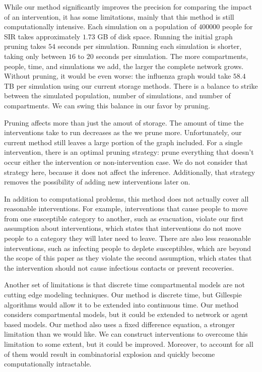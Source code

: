 \documentclass[openacc]{rsproca_new}%
\begin{document}
While our method significantly improves the precision for comparing the impact of an intervention, it has some limitations, mainly that this method is still computationally intensive.
Each simulation on a population of $400000$ people for SIR takes approximately $1.73$ GB of disk space.
Running the initial graph pruning takes $54$ seconds per simulation.
Running each simulation is shorter, taking only between $16$ to $20$ seconds per simulation.
The more compartments, people, time, and simulations we add, the larger the complete network grows.
Without pruning, it would be even worse: the influenza graph would take $58.4$ TB per simulation using our current storage methods.
There is a balance to strike between the simulated population, number of simulations, and number of compartments.
We can swing this balance in our favor by pruning.

Pruning affects more than just the amout of storage.
The amount of time the interventions take to run decreases as the we prune more.
Unfortunately, our current method still leaves a large portion of the graph included.
For a single intervention, there is an optimal pruning strategy: prune everything that doesn't occur either the intervention or non-intervention case.
We do not consider that strategy here, because it does not affect the inference.
Additionally, that strategy removes the possibility of adding new interventions later on.

In addition to computational problems, this method does not actually cover all reasonable interventions.
For example, interventions that cause people to move from one susceptible category to another, such as evacuation, violate our first assumption about interventions, which states that interventions do not move people to a category they will later need to leave.
There are also less reasonable interventions, such as infecting people to deplete susceptibles, which are beyond the scope of this paper as they violate the second assumption, which states that the intervention should not cause infectious contacts or prevent recoveries.

Another set of limitations is that discrete time compartmental models are not cutting edge modeling techniques.
Our method is discrete time, but Gillespie algorithms would allow it to be extended into continuous time.
Our method considers compartmental models, but it could be extended to network or agent based models.
Our method also uses a fixed difference equation, a stronger limitation than we would like.
We can construct interventions to overcome this limitation to some extent, but it could be improved.
Moreover, to account for all of them would result in  combinatorial explosion and quickly become computationally intractable. %
\end{document}
